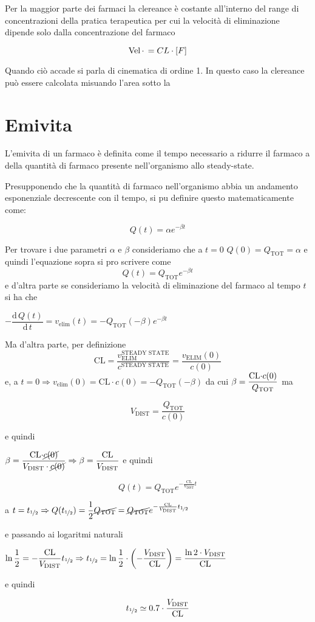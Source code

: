Per la maggior parte dei farmaci la clereance è costante all'interno del range di concentrazioni della pratica terapeutica per cui la velocità di eliminazione dipende solo dalla concentrazione del farmaco

$$\ce{Vel.} = CL \cdot [F]$$

Quando ciò accade si parla di cinematica di ordine 1. In questo caso la clereance può essere calcolata misuando l'area sotto la

\section{Emivita}

L'emivita di un farmaco è definita come il tempo necessario a ridurre
il farmaco a  della quantità di farmaco presente nell'organismo
allo steady-state.

Presupponendo che la quantità di farmaco nell'organismo abbia un andamento esponenziale decrescente con il tempo, si pu definire questo matematicamente come:

$$
Q(t)=\alpha e^{-\beta t}
$$

Per trovare i due parametri $\alpha$ e $\beta$ consideriamo che a $t=0$
$Q(0)=Q_{\text{TOT}}=\alpha$ e quindi l'equazione sopra si pro scrivere come
$$
Q(t)=Q_{\text{TOT}}e^{-\beta t}
$$
e d'altra parte se consideriamo la velocità di eliminazione del farmaco
al tempo $t$ si ha che\vspace{.5em}

$-\dfrac{\text{d}\,Q(t)}{\text{d}\,t}=v_{\text{elim}}(t)=-Q_{\text{TOT}}(-\beta)e^{-\beta t}$ \vspace{.5em}

Ma d'altra parte, per definizione
$$
\text{CL} = \dfrac{v_\text{ELIM}^\text{STEADY STATE}}{c^\text{STEADY STATE}} =\dfrac{v_\text{ELIM}(0)}{c(0)}
$$
e, a $t=0\Rightarrow v_{\text{elim}}(0)=\text{CL}\cdot c(0)=-Q_{\text{TOT}}(-\beta)$ da cui
$\beta=\dfrac{\text{CL\ensuremath{\cdot}}c(0)}{Q_{\text{TOT}}}$ ma

$$V_\text{DIST} = \dfrac{Q_{\text{TOT}}}{c(0)}$$ 

e quindi \vspace{.5em}

$\beta=\dfrac{\text{CL\ensuremath{\cdot}}\cancel{c(0)}}{V_{\text{DIST}}\cdot\cancel{c(0)}}\Rightarrow\beta=\dfrac{\text{CL}}{V_{\text{DIST}}}$ e quindi

$$
Q(t)=Q_{\text{TOT}}e^{-\frac{\text{CL}}{V_{\text{DIST}}}t}
$$


a $t=t_{\unitfrac{1}{2}}\Rightarrow Q(t_{\unitfrac{1}{2}})=\dfrac{1}{2}\cancel{Q_{\text{TOT}}}=\cancel{Q_{\text{TOT}}}e^{-\frac{\text{CL}}{V_{\text{DIST}}}t_{\unitfrac{1}{2}}}$ 

e passando ai logaritmi naturali

$\ln\dfrac{1}{2}=-\dfrac{\text{CL}}{V_{\text{DIST}}}t_{\unitfrac{1}{2}}\Rightarrow t_{\unitfrac{1}{2}}=\ln\dfrac{1}{2}\cdot\left(-\dfrac{V_{\text{DIST}}}{\text{CL}}\right)=\dfrac{\ln2\cdot V_{\text{DIST}}}{\text{CL}}$

e quindi

\[
t_{\unitfrac{1}{2}}\simeq0.7\cdot\dfrac{V_{\text{DIST}}}{\text{CL}}
\]

